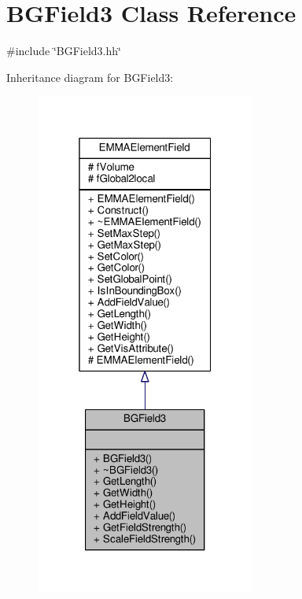 \hypertarget{classBGField3}{}\section{B\+G\+Field3 Class Reference}
\label{classBGField3}


{\ttfamily \#include \char`\"{}B\+G\+Field3.\+hh\char`\"{}}



Inheritance diagram for B\+G\+Field3\+:
\nopagebreak
\begin{figure}[H]
\begin{center}
\leavevmode
\includegraphics[width=205pt]{classBGField3__inherit__graph}
\end{center}
\end{figure}


